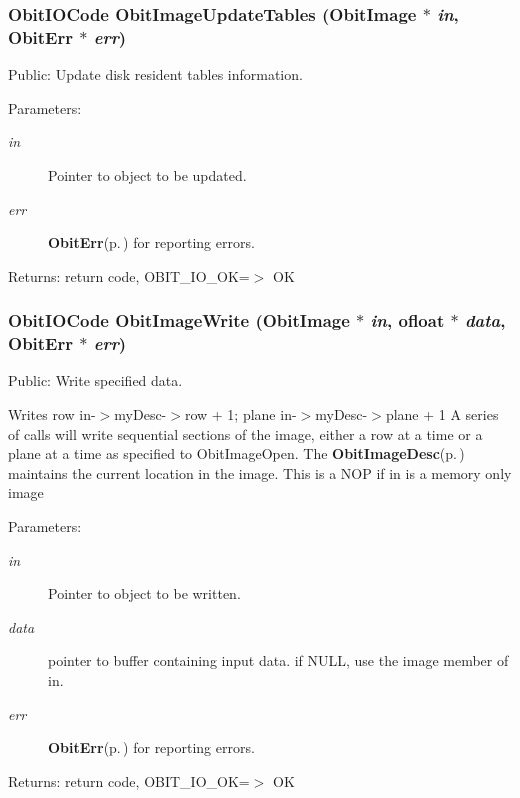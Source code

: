 \subsubsection{\setlength{\rightskip}{0pt plus 5cm}Obit\-IOCode Obit\-Image\-Update\-Tables ({\bf Obit\-Image} $\ast$ {\em in}, {\bf Obit\-Err} $\ast$ {\em err})}\label{ObitImage_8h_a38}


Public: Update disk resident tables information. 

\begin{Desc}
\item[Parameters:]
\begin{description}
\item[{\em in}]Pointer to object to be updated. \item[{\em err}]{\bf Obit\-Err}{\rm (p.\,\pageref{structObitErr})} for reporting errors. \end{description}
\end{Desc}
\begin{Desc}
\item[Returns:]return code, OBIT\_\-IO\_\-OK=$>$ OK \end{Desc}
\subsubsection{\setlength{\rightskip}{0pt plus 5cm}Obit\-IOCode Obit\-Image\-Write ({\bf Obit\-Image} $\ast$ {\em in}, {\bf ofloat} $\ast$ {\em data}, {\bf Obit\-Err} $\ast$ {\em err})}\label{ObitImage_8h_a32}


Public: Write specified data. 

Writes row in-$>$my\-Desc-$>$row + 1; plane in-$>$my\-Desc-$>$plane + 1 A series of calls will write sequential sections of the image, either a row at a time or a plane at a time as specified to Obit\-Image\-Open. The {\bf Obit\-Image\-Desc}{\rm (p.\,\pageref{structObitImageDesc})} maintains the current location in the image. This is a NOP if in is a memory only image \begin{Desc}
\item[Parameters:]
\begin{description}
\item[{\em in}]Pointer to object to be written. \item[{\em data}]pointer to buffer containing input data. if NULL, use the image member of in. \item[{\em err}]{\bf Obit\-Err}{\rm (p.\,\pageref{structObitErr})} for reporting errors. \end{description}
\end{Desc}
\begin{Desc}
\item[Returns:]return code, OBIT\_\-IO\_\-OK=$>$ OK \end{Desc}
